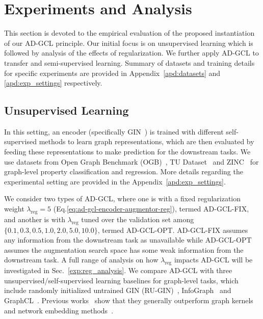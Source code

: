 \vspace{-3mm}
\section{Experiments and Analysis}
\vspace{-3mm}
\label{sec:exp}
This section is devoted to the empirical evaluation of the proposed instantiation of our AD-GCL principle. Our initial focus is on unsupervised learning which is followed by analysis of the effects of regularization. We further apply AD-GCL to transfer and semi-supervised learning. Summary of datasets and training details for specific experiments are provided in Appendix~\ref{apd:datasets} and \ref{apd:exp_settings} respectively.

\vspace{-3mm}
\subsection{Unsupervised Learning}
\vspace{-3mm}
\label{exp:unsup}
In this setting, an encoder (specifically GIN~\cite{xu2018how}) is trained with different self-supervised methods to learn graph representations, which are then evaluated by feeding these representations to make prediction for the downstream tasks. We use datasets from Open Graph Benchmark (OGB)~\cite{hu2020open}, TU Dataset~\cite{Morris+2020} and ZINC~\cite{dwivedi2020benchmarking} for graph-level property classification and regression. More details regarding the experimental setting are provided in the Appendix~\ref{apd:exp_settings}.

We consider two types of AD-GCL, where one is with a fixed regularization weight $\lambda_{\text{reg}}=5$ (Eq.\ref{eq:ad-gcl-encoder-augmentor-reg}), termed AD-GCL-FIX, and another is with $\lambda_{\text{reg}}$ tuned over the validation set among $\{0.1, 0.3, 0.5, 1.0, 2.0, 5.0, 10.0\}$, termed AD-GCL-OPT. AD-GCL-FIX assumes any information from the downstream task as unavailable while AD-GCL-OPT assumes the augmentation search space has some weak information from the downstream task. A full range of analysis on how $\lambda_{\text{reg}}$ impacts AD-GCL will be investigated in Sec.~\ref{exp:reg_analysis}. We compare AD-GCL with three unsupervised/self-supervised learning baselines for graph-level tasks, which include randomly initialized untrained GIN (RU-GIN)~\cite{xu2018how}, InfoGraph~\cite{sun2019infograph} and GraphCL~\cite{you2020graph}. Previous works~\cite{you2020graph, sun2019infograph} show that they generally outperform graph kernels~\cite{kriege2020survey,yanardag2015deep,shervashidze2011weisfeiler} and network embedding methods~\cite{grover2016node2vec, perozzi2014deepwalk, narayanan2017graph2vec,adhikari2018sub2vec}.

